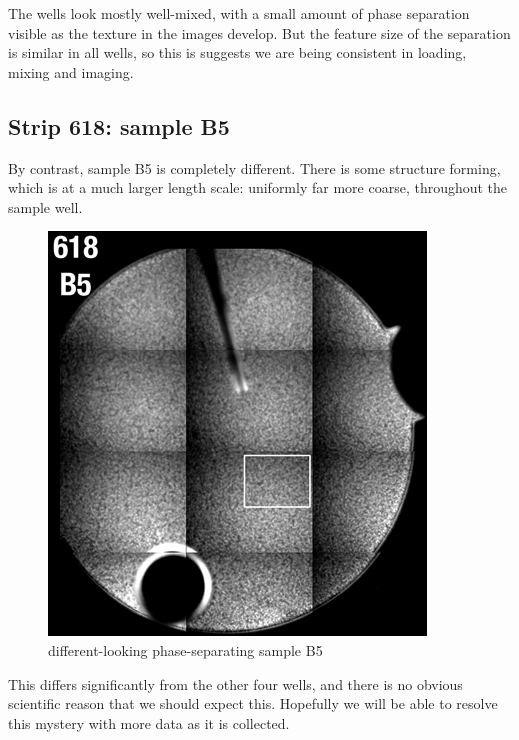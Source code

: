 The wells look mostly well-mixed, with a small amount of phase separation
visible as the texture in the images develop. But the feature size of the
separation is similar in all wells, so this is suggests we are being consistent
in loading, mixing and imaging.

\subsection{Strip 618: sample B5}\hypertarget{strip-618-sample-b5}{}\label{strip-618-sample-b5}
By contrast, sample B5 is completely different. There is some structure forming,
which is at a much larger length scale: uniformly far more coarse, throughout
the sample well.
\begin{figure}
\begin{center}
\includegraphics[width=\columnwidth]{./images/2014_07_14_ace_m2_run4/B5_80uM_run4_web.png}
\end{center}
\caption{different-looking phase-separating sample B5}
\end{figure}

This differs significantly from the other four wells, and there is no obvious
scientific reason that we should expect this. Hopefully we will be able to
resolve this mystery with more data as it is collected.